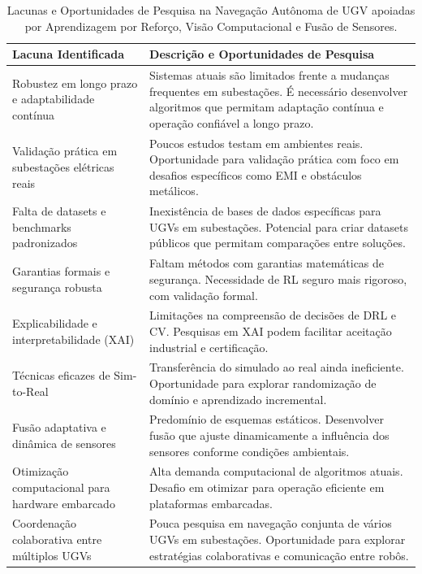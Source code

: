 \begin{table}[H]
    \centering
    \caption{Lacunas e Oportunidades de Pesquisa na Navegação Autônoma de UGV apoiadas por Aprendizagem por Reforço, Visão Computacional e Fusão de Sensores.}
    \label{tab:lacunas_oportunidades}
    \begin{tabularx}{\textwidth}{|>{\hsize=0.33\hsize}X|>{\hsize=0.67\hsize}X|}
        \hline
        \textbf{Lacuna Identificada} & \textbf{Descrição e Oportunidades de Pesquisa} \\
        \hline
        Robustez em longo prazo e adaptabilidade contínua & Sistemas atuais são limitados frente a mudanças frequentes em subestações. É necessário desenvolver algoritmos que permitam adaptação contínua e operação confiável a longo prazo. \\
        \hline
        Validação prática em subestações elétricas reais & Poucos estudos testam em ambientes reais. Oportunidade para validação prática com foco em desafios específicos como EMI e obstáculos metálicos. \\
        \hline
        Falta de datasets e benchmarks padronizados & Inexistência de bases de dados específicas para UGVs em subestações. Potencial para criar datasets públicos que permitam comparações entre soluções. \\
        \hline
        Garantias formais e segurança robusta & Faltam métodos com garantias matemáticas de segurança. Necessidade de RL seguro mais rigoroso, com validação formal. \\
        \hline
        Explicabilidade e interpretabilidade (XAI) & Limitações na compreensão de decisões de DRL e CV. Pesquisas em XAI podem facilitar aceitação industrial e certificação. \\
        \hline
        Técnicas eficazes de Sim-to-Real & Transferência do simulado ao real ainda ineficiente. Oportunidade para explorar randomização de domínio e aprendizado incremental. \\
        \hline
        Fusão adaptativa e dinâmica de sensores & Predomínio de esquemas estáticos. Desenvolver fusão que ajuste dinamicamente a influência dos sensores conforme condições ambientais. \\
        \hline
        Otimização computacional para hardware embarcado & Alta demanda computacional de algoritmos atuais. Desafio em otimizar para operação eficiente em plataformas embarcadas. \\
        \hline
        Coordenação colaborativa entre múltiplos UGVs & Pouca pesquisa em navegação conjunta de vários UGVs em subestações. Oportunidade para explorar estratégias colaborativas e comunicação entre robôs. \\
        \hline
    \end{tabularx}
\end{table}


